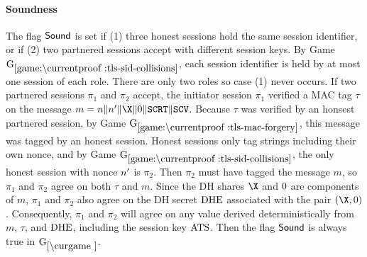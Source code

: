 \begin{collectinmacro}{\TLSProofFull}{}{}
\paragraph{Soundness}
The flag $\mathsf{Sound}$ is set if (1) three honest sessions hold the same session identifier, or if (2) two partnered sessions accept with different session keys. 
By Game $\lblGm{tls-sid-collisions}$, each session identifier is held by at most one session of each role. There are only two roles so case (1) never occurs.
If two partnered sessions $\pi_1$ and $\pi_2$ accept, the initiator session $\pi_1$ verified a MAC tag $\tau$ on the message $m = \nonce\conc \nonce' \conc \X \conc \Y\conc \sSCERT \conc \sSCERTV$. Because $\tau$ was verified by an honsest partnered session, by Game $\lblGm{tls-mac-forgery}$, this message was tagged by an honest session.
Honest sessions only tag strings including their own nonce, and by Game $\lblGm{tls-sid-collisions}$, the only honest session with nonce $n'$ is $\pi_2$. Then $\pi_2$ must have tagged the message $m$, so $\pi_1$ and $\pi_2$ agree on both $\tau$ and $m$. Since the DH shares $\X$ and $\Y$ are components of $m$, $\pi_1$ and $\pi_2$ also agree on the DH secret $\mathrm{DHE}$ associated with the pair $(\X,\Y)$. Consequently, $\pi_1$ and $\pi_2$ will agree on any value derived deterministically from $m$, $\tau$, and $\mathrm{DHE}$, including the session key $\mathrm{ATS}$. 
Then the flag $\mathsf{Sound}$ is always true in $\curGm$.


\end{collectinmacro}
